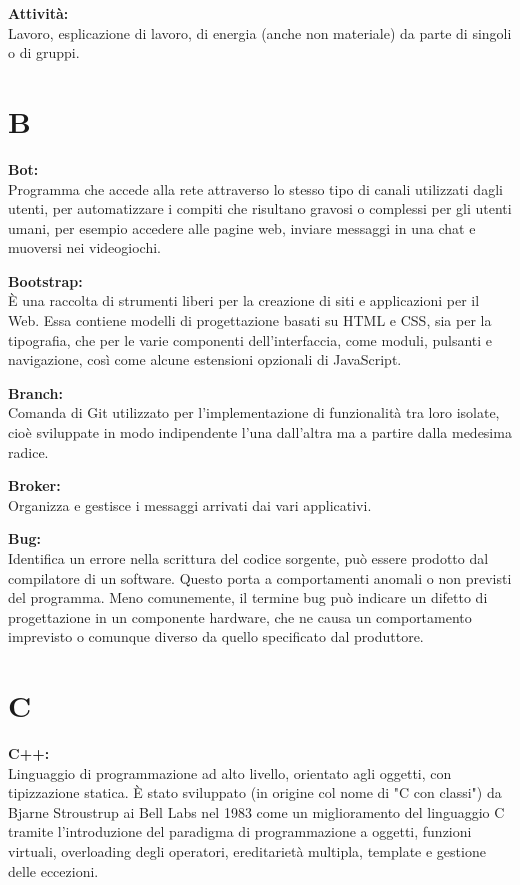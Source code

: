 \documentclass[a4paper, oneside, openany, dvipsnames, table]{article}
\begin{document}
\textbf{Attività:}\\ Lavoro, esplicazione di lavoro, di energia (anche non materiale) da parte di singoli o di gruppi.


\newpage
\section{B}
\textbf{Bot:}\\	Programma che accede alla rete attraverso lo stesso tipo di canali utilizzati dagli utenti, per automatizzare i compiti che risultano gravosi o complessi per gli utenti umani, per esempio accedere alle pagine web, inviare messaggi in una chat e  muoversi nei videogiochi.
 
\textbf{Bootstrap:}\\	\`E una raccolta di strumenti liberi per la creazione di siti e applicazioni per il Web. Essa contiene modelli di progettazione basati su HTML e CSS,
 sia per la tipografia, che per le varie componenti dell'interfaccia, come moduli, pulsanti e navigazione, così come alcune estensioni opzionali di JavaScript.

\textbf{Branch:}\\ Comanda di Git utilizzato per l’implementazione di funzionalità tra loro isolate, cioè sviluppate in modo indipendente l’una dall’altra ma a partire dalla medesima radice.


\textbf{Broker:}\\ Organizza e gestisce i messaggi arrivati dai vari applicativi.

\textbf{Bug:}\\	Identifica un errore nella scrittura del codice sorgente, può essere prodotto dal compilatore di un software. Questo porta a comportamenti anomali o non previsti del programma. Meno comunemente, il termine bug può indicare un difetto di progettazione in un componente hardware, che ne causa un comportamento imprevisto o comunque diverso da quello specificato dal produttore.


\newpage
\section{C}
\textbf{C++:}\\	Linguaggio di programmazione ad alto livello, orientato agli oggetti, con tipizzazione statica. \`E stato sviluppato (in origine col nome di "C con classi") da Bjarne Stroustrup ai Bell Labs nel 
1983 come un miglioramento del linguaggio C tramite l'introduzione del paradigma di programmazione a oggetti, 
funzioni virtuali, overloading degli operatori, ereditarietà multipla, template e gestione delle eccezioni.
\end{document}
